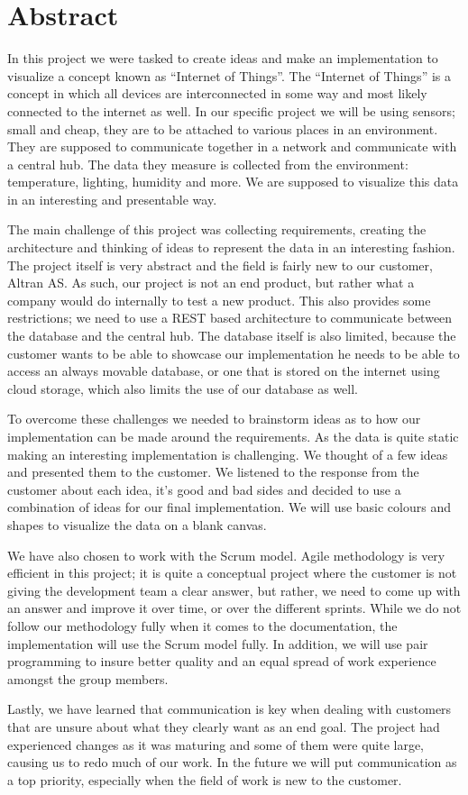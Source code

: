 ﻿\documentclass[../document.tex]{subfiles}
\begin{document}
\section*{Abstract}
In this project we were tasked to create ideas and make an implementation to visualize a concept known as ``Internet of Things''. The ``Internet of Things'' is a concept in which all devices are interconnected in some way and most likely connected to the internet as well. In our specific project we will be using sensors; small and cheap, they are to be attached to various places in an environment. They are supposed to communicate together in a network and communicate with a central hub. The data they measure is collected from the environment: temperature, lighting, humidity and more. We are supposed to visualize this data in an interesting and presentable way.

The main challenge of this project was collecting requirements, creating the architecture and thinking of ideas to represent the data in an interesting fashion. The project itself is very abstract and the field is fairly new to our customer, Altran AS. As such, our project is not an end product, but rather what a company would do internally to test a new product. This also provides some restrictions; we need to use a REST based architecture to communicate between the database and the central hub. The database itself is also limited, because the customer wants to be able to showcase our implementation he needs to be able to access an always movable database, or one that is stored on the internet using cloud storage, which also limits the use of our database as well.

To overcome these challenges we needed to brainstorm ideas as to how our implementation can be made around the requirements. As the data is quite static making an interesting implementation is challenging. We thought of a few ideas and presented them to the customer. We listened to the response from the customer about each idea, it’s good and bad sides and decided to use a combination of ideas for our final implementation. We will use basic colours and shapes to visualize the data on a blank canvas.

We have also chosen to work with the Scrum model. Agile methodology is very efficient in this project; it is quite a conceptual project where the customer is not giving the development team a clear answer, but rather, we need to come up with an answer and improve it over time, or over the different sprints. While we do not follow our methodology fully when it comes to the documentation, the implementation will use the Scrum model fully. In addition, we will use pair programming to insure better quality and an equal spread of work experience amongst the group members.

Lastly, we have learned that communication is key when dealing with customers that are unsure about what they clearly want as an end goal. The project had experienced changes as it was maturing and some of them were quite large, causing us to redo much of our work. In the future we will put communication as a top priority, especially when the field of work is new to the customer.
\end{document}

